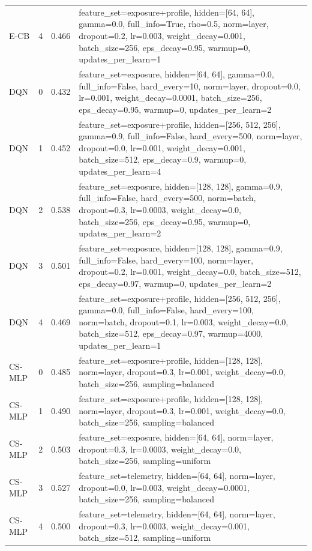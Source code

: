 \begin{longtable}{llcp{}}
E-CB & 4 & 0.466 & \footnotesize feature\_set=exposure+profile, hidden=[64, 64], gamma=0.0, full\_info=True, rho=0.5, norm=layer, dropout=0.2, lr=0.003, weight\_decay=0.001, batch\_size=256, eps\_decay=0.95, warmup=0, updates\_per\_learn=1 \\
DQN & 0 & 0.432 & \footnotesize feature\_set=exposure, hidden=[64, 64], gamma=0.0, full\_info=False, hard\_every=10, norm=layer, dropout=0.0, lr=0.001, weight\_decay=0.0001, batch\_size=256, eps\_decay=0.95, warmup=0, updates\_per\_learn=2 \\
DQN & 1 & 0.452 & \footnotesize feature\_set=exposure+profile, hidden=[256, 512, 256], gamma=0.9, full\_info=False, hard\_every=500, norm=layer, dropout=0.0, lr=0.001, weight\_decay=0.001, batch\_size=512, eps\_decay=0.9, warmup=0, updates\_per\_learn=4 \\
DQN & 2 & 0.538 & \footnotesize feature\_set=exposure, hidden=[128, 128], gamma=0.9, full\_info=False, hard\_every=500, norm=batch, dropout=0.3, lr=0.0003, weight\_decay=0.0, batch\_size=256, eps\_decay=0.95, warmup=0, updates\_per\_learn=2 \\
DQN & 3 & 0.501 & \footnotesize feature\_set=exposure, hidden=[128, 128], gamma=0.9, full\_info=False, hard\_every=100, norm=layer, dropout=0.2, lr=0.001, weight\_decay=0.0, batch\_size=512, eps\_decay=0.97, warmup=0, updates\_per\_learn=2 \\
DQN & 4 & 0.469 & \footnotesize feature\_set=exposure+profile, hidden=[256, 512, 256], gamma=0.0, full\_info=False, hard\_every=100, norm=batch, dropout=0.1, lr=0.003, weight\_decay=0.0, batch\_size=512, eps\_decay=0.97, warmup=4000, updates\_per\_learn=1 \\
CS-MLP & 0 & 0.485 & \footnotesize feature\_set=exposure+profile, hidden=[128, 128], norm=layer, dropout=0.3, lr=0.001, weight\_decay=0.0, batch\_size=256, sampling=balanced \\
CS-MLP & 1 & 0.490 & \footnotesize feature\_set=exposure+profile, hidden=[128, 128], norm=layer, dropout=0.3, lr=0.001, weight\_decay=0.0, batch\_size=256, sampling=balanced \\
CS-MLP & 2 & 0.503 & \footnotesize feature\_set=exposure, hidden=[64, 64], norm=layer, dropout=0.3, lr=0.0003, weight\_decay=0.0, batch\_size=256, sampling=uniform \\
CS-MLP & 3 & 0.527 & \footnotesize feature\_set=telemetry, hidden=[64, 64], norm=layer, dropout=0.0, lr=0.003, weight\_decay=0.0001, batch\_size=256, sampling=balanced \\
CS-MLP & 4 & 0.500 & \footnotesize feature\_set=telemetry, hidden=[64, 64], norm=layer, dropout=0.3, lr=0.0003, weight\_decay=0.001, batch\_size=512, sampling=uniform \\

\end{longtable}
